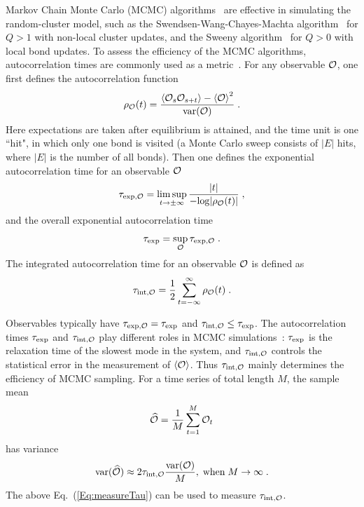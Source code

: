 \documentclass[aps,pre,twocolumn,superscriptaddress,longbibliography,floatfix]{revtex4-2}
\begin{document}
Markov Chain Monte Carlo (MCMC) algorithms~\cite{newman1999monte,landau2005guide} are effective in simulating the random-cluster model, such as the Swendsen-Wang-Chayes-Machta algorithm~\cite{swendsen1987nonuniversal,chayes1998graphical} for $Q>1$ with non-local cluster updates, and the Sweeny algorithm~\cite{sweeny1983monte} for $Q>0$ with local bond updates. To assess the efficiency of the MCMC algorithms, autocorrelation times are commonly used as a metric~\cite{sokal1997functional}. For any observable ${\cal O}$, one first defines the autocorrelation function 
\begin{align}
    \rho_{\cal O}(t) = \frac{\langle {{\cal O}_{s}{\cal O}_{s+t}}\rangle-{\langle {\cal O}\rangle}^2}{{\rm var}({\cal O})} \;.
\end{align}
Here expectations are taken after equilibrium is attained, and the time unit is one ``hit", in which only one bond is visited (a Monte Carlo sweep consists of $|E|$ hits, where $|E|$ is the number of all bonds). Then {one defines} the exponential autocorrelation time for an observable $\cal O$
\begin{align}
    \tau_{{\rm exp},\cal O} = \limsup_{t \rightarrow \pm \infty}\frac{|t|}{{\rm-log}|\rho_{\cal O}(t)|} \;,
\end{align}
and the overall exponential autocorrelation time
\begin{align}
    \tau_{{\rm exp}}=\sup_{\cal O}\tau_{{\rm exp},\cal O} \;.
\end{align}
The integrated autocorrelation time for an observable $\cal O$ is defined as
\begin{align}
    \tau_{{\rm int},\cal O}=\frac{1}{2}\sum_{t=-\infty}^{\infty}\rho_{\cal O}(t) \;.
\end{align}


Observables typically have $\tau_{{\rm exp},{\cal O}}=\tau_{\rm exp}$ and $\tau_{{\rm int},\cal O} \le \tau_{\rm exp}$. 
The autocorrelation times $\tau_{\rm exp}$ and $\tau_{{\rm int},\cal O}$ play different roles in MCMC simulations~\cite{sokal1997functional}: $\tau_{{\rm exp}}$ is the relaxation time of the slowest mode in the system, and $\tau_{{\rm int},\cal O}$ controls the statistical error in the measurement of $\langle \cal O \rangle$. Thus {$\tau_{{\rm int},\cal O}$} mainly determines the efficiency of MCMC sampling.
 For a time series of total length $M$, the sample mean
\begin{align}
    \widehat{{\cal O}}=\frac{1}{M}\sum_{t=1}^{M}{\cal O}_t
\end{align}
has variance
\begin{align}
    {\rm var}(\widehat{{\cal O}}) \approx 2\tau_{{\rm int},{\cal O}} \frac{{\rm var}({\cal O})}{M},    {\; \rm when \;} M\to \infty \;.
    \label{Eq:measureTau}
\end{align}
The above Eq.~(\ref{Eq:measureTau}) can be used to measure $\tau_{{\rm int},{\cal O}}$.
\end{document}
